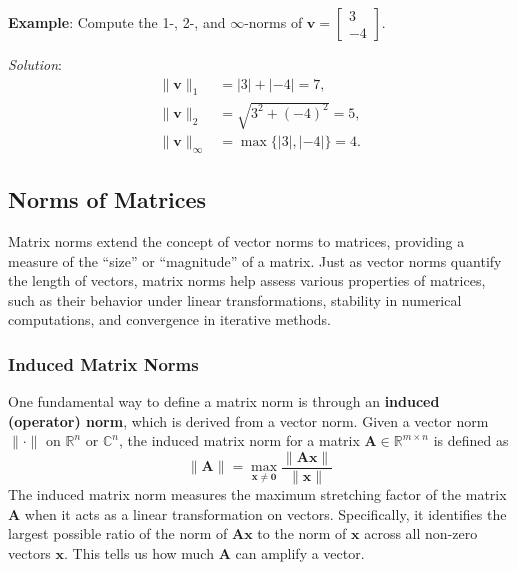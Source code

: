\begin{exampleBox}
    \textbf{Example}: Compute the 1-, 2-, and $\infty$-norms of $ \mathbf{v} = \begin{bmatrix}3 \\ -4\end{bmatrix} $.

    \emph{Solution}:
    \begin{align*}
        \|\mathbf{v}\|_1 &= |3| + |-4| = 7, \\
        \|\mathbf{v}\|_2 &= \sqrt{3^2 + (-4)^2} = 5, \\
        \|\mathbf{v}\|_\infty &= \max\{ |3|, |-4| \} = 4.
    \end{align*}
\end{exampleBox}

\subsection{Norms of Matrices}
Matrix norms extend the concept of vector norms to matrices, providing a measure of the ``size'' or ``magnitude'' of a matrix. Just as vector norms quantify the length of vectors, matrix norms help assess various properties of matrices, such as their behavior under linear transformations, stability in numerical computations, and convergence in iterative methods.

\subsubsection{Induced Matrix Norms}
One fundamental way to define a matrix norm is through an \textbf{induced (operator) norm}, which is derived from a vector norm. Given a vector norm $ \|\cdot\| $ on $ \mathbb{R}^n $ or $ \mathbb{C}^n $, the induced matrix norm for a matrix $ \mathbf{A} \in \mathbb{R}^{m \times n} $ is defined as
\begin{equation*}
    \|\mathbf{A}\| = \max_{\mathbf{x} \neq \mathbf{0}} \frac{\|\mathbf{A}\mathbf{x}\|}{\|\mathbf{x}\|}
\end{equation*}
The induced matrix norm measures the maximum stretching factor of the matrix $ \mathbf{A} $ when it acts as a linear transformation on vectors. Specifically, it identifies the largest possible ratio of the norm of $ \mathbf{A}\mathbf{x} $ to the norm of $ \mathbf{x} $ across all non-zero vectors $ \mathbf{x} $. This tells us how much $ \mathbf{A} $ can amplify a vector.

